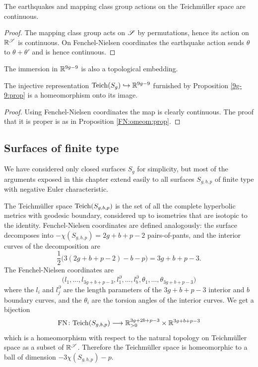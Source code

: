 \begin{prop}
The earthquakes and mapping class group actions on the Teichm\"uller space are continuous.
\end{prop}
\begin{proof}
The mapping class group acts on $\mathscr{S}$ by permutations, hence its action on $\mathbb{R}^\mathscr{S}$ is continuous. On Fenchel-Nielsen coordinates the earthquake action sends $\theta$ to $\theta+\theta'$ and is hence continuous.
\end{proof}

The immersion in $\mathbb{R}^{9g-9}$ is also a topological embedding.

\begin{prop}
The injective representation ${\rm Teich}(S_g) \hookrightarrow \mathbb{R}^{9g-9}$
furnished by Proposition \ref{9g-9:prop} is a homeomorphism onto its image.
\end{prop}
\begin{proof}
Using Fenchel-Nielsen coordinates the map is clearly continuous. The proof that it is proper is as in Proposition \ref{FN:omeom:prop}.
\end{proof}

\subsection{Surfaces of finite type} \label{Teich:finite:type:subsection}
We have considered only closed surfaces $S_g$ for simplicity, but most of the arguments exposed in this chapter extend easily to all surfaces $S_{g,b,p}$ of finite type with negative Euler characteristic. 

The Teichm\"uller space ${\rm Teich}(S_{g,b,p})$ is the set of all the complete hyperbolic metrics with geodesic boundary, considered up to isometries that are isotopic to the identity. Fenchel-Nielsen coordinates are defined analogously: the surface decomposes into $-\chi(S_{g,b,p}) = 2g+b+p-2$ pairs-of-pants, and the interior curves of the decomposition are 
$$\frac 12 \big(3(2g+b+p-2) - b - p \big) = 3g+b+p-3.$$
The Fenchel-Nielsen coordinates are
$$\big(l_1, \ldots, l_{3g+b+p-3}, l_1^\partial, \ldots, l_b^\partial, \theta_1,\ldots, \theta_{3g+b+p-3}\big)$$
where the $l_i$ and $l_j^\partial$ are the length parameters of the $3g+b+p-3$ interior and $b$ boundary curves, and the $\theta_i$ are the torsion angles of the interior curves. We get a bijection
$${\rm FN}\colon {\rm Teich} (S_{g,b,p}) \longrightarrow \mathbb{R}_{>0}^{3g+2b+p-3} \times \mathbb{R}^{3g+b+p-3}$$
which is a homeomorphism with respect to the natural topology on Teichm\"uller space as a subset of $\mathbb{R}^\mathscr{S}$. Therefore the Teichm\"uller space is homeomorphic to a ball of dimension $-3\chi(S_{g,b,p})-p$.

